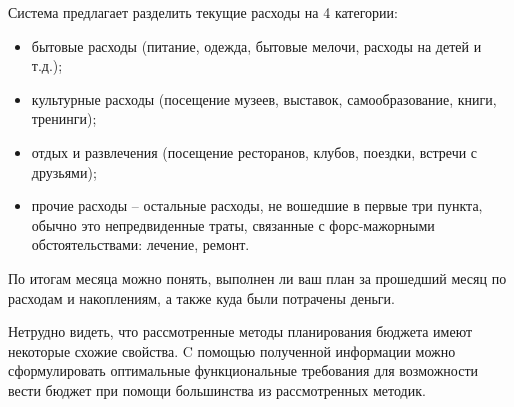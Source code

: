 Система предлагает разделить текущие расходы на 4 категории:
\begin{itemize}
\item бытовые расходы (питание, одежда, бытовые мелочи, расходы на детей и т.д.);
\item культурные расходы (посещение музеев, выставок, самообразование, книги, тренинги);
\item отдых и развлечения (посещение ресторанов, клубов, поездки, встречи с друзьями);
\item прочие расходы -- остальные расходы, не вошедшие в первые три пункта, обычно это непредвиденные траты, связанные с форс-мажорными обстоятельствами: лечение, ремонт.
\end{itemize}
По итогам месяца можно понять, выполнен ли ваш план за прошедший месяц по расходам и накоплениям, а также куда были потрачены деньги.

Нетрудно видеть, что рассмотренные методы планирования бюджета имеют некоторые схожие свойства.
C помощью полученной информации можно сформулировать оптимальные функциональные требования для возможности вести бюджет при помощи большинства из рассмотренных методик.  